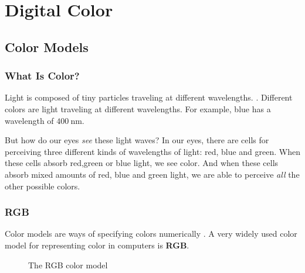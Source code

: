 \begin{comment}
  
\end{comment}

\chapter{Digital Color}
\label{cha:color}

\begin{refsection}

  \section{Color Models}
  \label{sec:color-models}

  \subsection{What Is Color?}
  \label{sec:what-color}

  \newcommand{\bluewave}{\ensuremath{\SI{400}{\nano\meter}}}

  Light is composed of tiny particles traveling at different
  wavelengths. \cite{neider93:_openg_progr_guide}.
  Different colors are light traveling at different wavelengths. For
  example, blue has a wavelength of
  \bluewave \cite{ohlsson99:_digit_bild_kreat}.

  But how do our eyes \textit{see} these light waves? In our eyes,
  there are cells for perceiving three different kinds of wavelengths
  of light: red, blue and green. When these cells absorb red,green or
  blue light, we see color. And when these cells absorb mixed amounts
  of red, blue and green light, we are able to perceive \textit{all}
  the other possible colors.

  \subsection{RGB}
  \label{sec:rgb}

  Color models are ways of specifying colors
  numerically \cite{fadgi11:color_model}. A very widely used color
  model for representing color in computers is \textbf{RGB}.

  \begin{figure}
    \centering
    \caption{The RGB color model}
    \label{fig:rgb}
  \end{figure}


\end{refsection}
